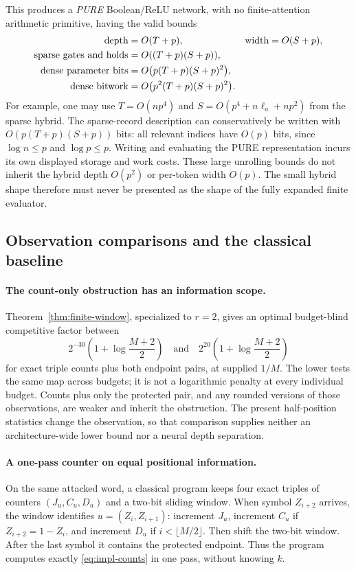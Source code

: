 This produces a \emph{PURE} Boolean/ReLU network, with no finite-attention
arithmetic primitive, having the valid bounds
\begin{align}
 \text{depth}&=O(T+p),&
 \text{width}&=O(S+p),\notag\\
 \text{sparse gates and holds}&=O((T+p)(S+p)),&&\label{eq:impl-pure}\\
 \text{dense parameter bits}&=O\bigl(p(T+p)(S+p)^2\bigr),&&\notag\\
 \text{dense bitwork}&=O\bigl(p^2(T+p)(S+p)^2\bigr).&&\notag
\end{align}
For example, one may use
$T=O(np^4)$ and $S=O(p^4+n\ell_a+np^2)$ from the sparse hybrid.
The sparse-record description can conservatively be written with
$O(p(T+p)(S+p))$ bits: all relevant indices have $O(p)$ bits, since
$\log n\le p$ and $\log p\le p$.
Writing and evaluating the PURE representation incurs its own displayed
storage and work costs. These large unrolling bounds do not inherit the
hybrid depth $O(p^2)$ or per-token width $O(p)$. The small hybrid shape
therefore must never be presented as the shape of the fully expanded
finite evaluator.

\subsection{Observation comparisons and the classical baseline}
\label{sec:impl-comparisons}

\paragraph{The count-only obstruction has an information scope.}
Theorem~\ref{thm:finite-window}, specialized to $r=2$, gives an optimal
budget-blind competitive factor between
\[
 2^{-30}\left(1+\log\frac{M+2}{2}\right)
 \quad\text{and}\quad
 2^{20}\left(1+\log\frac{M+2}{2}\right)
\]
for exact triple counts plus both endpoint pairs, at supplied $1/M$.
The lower tests the same map across budgets; it is not a logarithmic
penalty at every individual budget. Counts plus only the protected pair,
and any rounded versions of those observations, are weaker and inherit
the obstruction. The present half-position statistics change the
observation, so that comparison supplies neither an architecture-wide
lower bound nor a neural depth separation.

\paragraph{A one-pass counter on equal positional information.}
On the same attacked word, a classical program keeps four exact triples
of counters $(J_u,C_u,D_u)$ and a two-bit sliding window. When symbol
$Z_{i+2}$ arrives, the window identifies $u=(Z_i,Z_{i+1})$: increment
$J_u$, increment $C_u$ if $Z_{i+2}=1-Z_i$, and increment $D_u$ if
$i<\lfloor M/2\rfloor$. Then shift the two-bit window. After the last
symbol it contains the protected endpoint. Thus the program computes
exactly \eqref{eq:impl-counts} in one pass, without knowing $k$.

